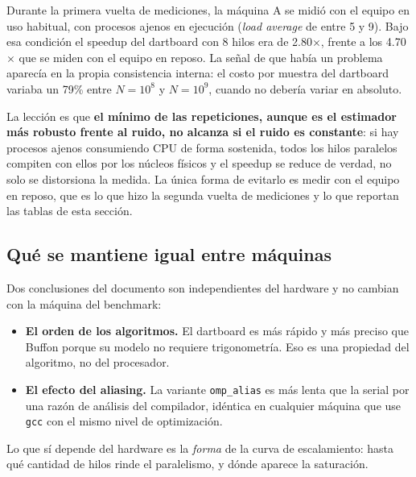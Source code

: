 Durante la primera vuelta de mediciones, la máquina A se midió con el equipo en uso habitual, con procesos ajenos en ejecución (\emph{load average} de entre 5 y 9). Bajo esa condición el speedup del dartboard con 8 hilos era de 2.80$\times$, frente a los 4.70$\times$ que se miden con el equipo en reposo. La señal de que había un problema aparecía en la propia consistencia interna: el costo por muestra del dartboard variaba un 79\% entre \(N = 10^8\) y \(N = 10^9\), cuando no debería variar en absoluto.

La lección es que \textbf{el mínimo de las repeticiones, aunque es el estimador más robusto frente al ruido, no alcanza si el ruido es constante}: si hay procesos ajenos consumiendo CPU de forma sostenida, todos los hilos paralelos compiten con ellos por los núcleos físicos y el speedup se reduce de verdad, no solo se distorsiona la medida. La única forma de evitarlo es medir con el equipo en reposo, que es lo que hizo la segunda vuelta de mediciones y lo que reportan las tablas de esta sección.

\subsection{Qué se mantiene igual entre máquinas}

Dos conclusiones del documento son independientes del hardware y no cambian con la máquina del benchmark:

\begin{itemize}
    \item \textbf{El orden de los algoritmos.} El dartboard es más rápido y más preciso que Buffon porque su modelo no requiere trigonometría. Eso es una propiedad del algoritmo, no del procesador.
    \item \textbf{El efecto del aliasing.} La variante \texttt{omp\_alias} es más lenta que la serial por una razón de análisis del compilador, idéntica en cualquier máquina que use \texttt{gcc} con el mismo nivel de optimización.
\end{itemize}

Lo que sí depende del hardware es la \emph{forma} de la curva de escalamiento: hasta qué cantidad de hilos rinde el paralelismo, y dónde aparece la saturación.
